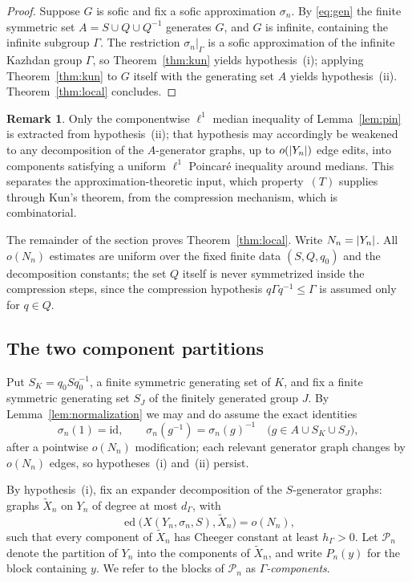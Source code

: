 \documentclass[11pt]{amsart}
\theoremstyle{definition}
\newtheorem{remark}[theorem]{Remark}
\theoremstyle{plain}
\newcommand{\id}{\mathrm{id}}
\newcommand{\cP}{\mathcal P}
\DeclarePairedDelimiter{\abs}{\lvert}{\rvert}
\DeclareMathOperator{\ed}{ed}
\begin{document}
\begin{proof}
Suppose \(G\) is sofic and fix a sofic approximation \(\sigma_n\).  By \eqref{eq:gen} the finite symmetric set \(A=S\cup Q\cup Q^{-1}\) generates \(G\), and \(G\) is infinite, containing the infinite subgroup \(\Gamma\).  The restriction \(\sigma_n|_\Gamma\) is a sofic approximation of the infinite Kazhdan group \(\Gamma\), so Theorem~\ref{thm:kun} yields hypothesis~(i); applying Theorem~\ref{thm:kun} to \(G\) itself with the generating set \(A\) yields hypothesis~(ii).  Theorem~\ref{thm:local} concludes.
\end{proof}

\begin{remark}\label{rem:poincare}
Only the componentwise \(\ell^1\) median inequality of Lemma~\ref{lem:pin} is extracted from hypothesis~(ii); that hypothesis may accordingly be weakened to any decomposition of the \(A\)-generator graphs, up to \(o(\abs{Y_n})\) edge edits, into components satisfying a uniform \(\ell^1\) Poincar\'e inequality around medians.  This separates the approximation-theoretic input, which property~\((T)\) supplies through Kun's theorem, from the compression mechanism, which is combinatorial.
\end{remark}

The remainder of the section proves Theorem~\ref{thm:local}.  Write \(N_n=\abs{Y_n}\).  All \(o(N_n)\) estimates are uniform over the fixed finite data \((S,Q,q_0)\) and the decomposition constants; the set \(Q\) itself is never symmetrized inside the compression steps, since the compression hypothesis \(q\Gamma q^{-1}\leq\Gamma\) is assumed only for \(q\in Q\).

\subsection{The two component partitions}\label{subsec:partitions}

Put \(S_K=q_0Sq_0^{-1}\), a finite symmetric generating set of \(K\), and fix a finite symmetric generating set \(S_J\) of the finitely generated group \(J\).  By Lemma~\ref{lem:normalization} we may and do assume the exact identities
\[
 \sigma_n(1)=\id,
 \qquad
 \sigma_n(g^{-1})=\sigma_n(g)^{-1}
 \quad\bigl(g\in A\cup S_K\cup S_J\bigr),
\]
after a pointwise \(o(N_n)\) modification; each relevant generator graph changes by \(o(N_n)\) edges, so hypotheses~(i) and~(ii) persist.

By hypothesis~(i), fix an expander decomposition of the \(S\)-generator graphs: graphs \(\widetilde X_n\) on \(Y_n\) of degree at most \(d_\Gamma\), with
\[
 \ed\bigl(X(Y_n,\sigma_n,S),\widetilde X_n\bigr)=o(N_n),
\]
such that every component of \(\widetilde X_n\) has Cheeger constant at least \(h_\Gamma>0\).  Let \(\cP_n\) denote the partition of \(Y_n\) into the components of \(\widetilde X_n\), and write \(P_n(y)\) for the block containing \(y\).  We refer to the blocks of \(\cP_n\) as \emph{\(\Gamma\)-components}.
\end{document}
